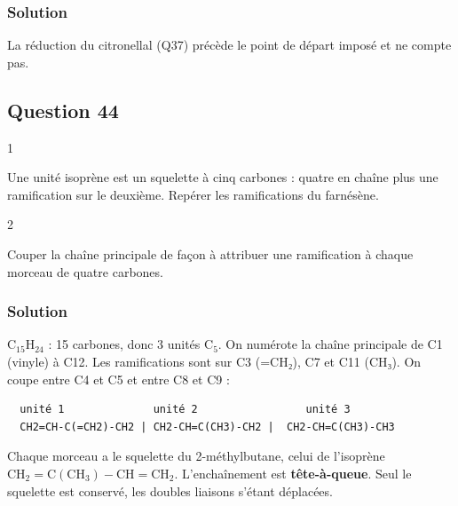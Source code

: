 \documentclass[11pt,a4paper]{article}
\newcommand{\equationajustee}[1]{%
  \sbox{\boiteequation}{$\displaystyle #1$}%
  \ifdim\wd\boiteequation>\linewidth
    \[\resizebox{\linewidth}{!}{\usebox{\boiteequation}}\]%
  \else
    \[#1\]%
  \fi}
\begin{document}
\hypertarget{solution-42}{%
\subsubsection{Solution}\label{solution-42}}

\equationajustee{\rho=0{,}70\times0{,}58\times0{,}84}

\equationajustee{\boxed{\rho\approx34\ \%}}

La réduction du citronellal (Q37) précède le point de départ imposé et ne compte pas.

\hypertarget{question-44}{%
\subsection{Question 44}\label{question-44}}

\begin{indication}{1}

Une unité isoprène est un squelette à cinq carbones : quatre en chaîne plus une ramification sur le deuxième. Repérer les ramifications du farnésène.

\end{indication}

\begin{indication}{2}

Couper la chaîne principale de façon à attribuer une ramification à chaque morceau de quatre carbones.

\end{indication}

\hypertarget{solution-43}{%
\subsubsection{Solution}\label{solution-43}}

\(\mathrm{C_{15}H_{24}}\) : 15 carbones, donc 3 unités \(\mathrm C_5\). On numérote la chaîne principale de C1 (vinyle) à C12. Les ramifications sont sur C3 (=CH₂), C7 et C11 (CH₃). On coupe entre C4 et C5 et entre C8 et C9 :

\begin{lstlisting}
  unité 1              unité 2                 unité 3
  CH2=CH-C(=CH2)-CH2 | CH2-CH=C(CH3)-CH2 |  CH2-CH=C(CH3)-CH3
\end{lstlisting}

Chaque morceau a le squelette du 2-méthylbutane, celui de l'isoprène \(\mathrm{CH_2{=}C(CH_3){-}CH{=}CH_2}\). L'enchaînement est \textbf{tête-à-queue}. Seul le squelette est conservé, les doubles liaisons s'étant déplacées.
\end{document}

